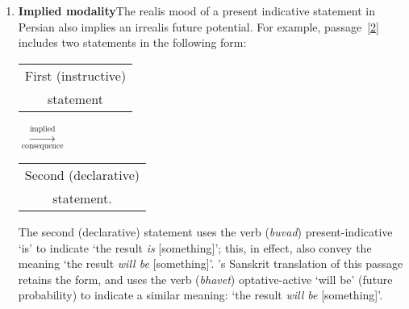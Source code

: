 \begin{enumerate}[topsep=0pt]
\begin{enumerate}[topsep=0pt]
    \item \label{implied_modality}\textbf{Implied modality}\quad The realis mood of a present indicative statement in Persian also implies an irrealis future potential. For example, passage~[\hyperlink{Ppass2}{2}] includes two statements in the following form:
    {\par\centering
    \begin{tabular}{c} First (instructive)\\ statement \end{tabular}%
    \quad$\overset{\text{implied}}{\underset{\text{consequence}}{\longrightarrow}}$\quad%
    \begin{tabular}{c} Second (declarative)\\ statement. \end{tabular}\par}
    The second (declarative) statement uses the verb  (\textit{buvad}) 
    \acrshort{present}-\acrshort{indicative} `is' to indicate `the result \textit{is} [something]'; this, in effect, also convey the meaning `the result \textit{will be} [something]'. \Nityananda's Sanskrit translation of this passage retains the form, and uses the verb  (\textit{bhavet}) \acrshort{optative}-\acrshort{active} `will be' (future probability) to indicate a similar meaning: `the result \textit{will be} [something]'.
    \end{enumerate}


\end{enumerate}
